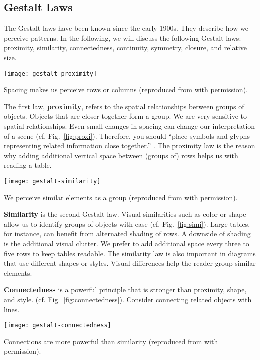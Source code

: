\subsection{Gestalt Laws}

The Gestalt laws have been known since the early 1900s. They describe how we perceive patterns. In the following, we will discuss the following Gestalt laws: proximity, similarity, connectedness, continuity, symmetry, closure, and relative size.

\begin{marginfigure}
\centering
\texttt{[image: gestalt-proximity]}
\caption{\label{fig:proxi} Spacing makes us perceive rows or columns (reproduced from \cite{Ware12} with permission).}%
\end{marginfigure}


The first law, \textbf{proximity}, refers to the spatial relationships between groups of objects. Objects that are closer together form a group. We are very sensitive to spatial relationships. Even small changes in spacing can change our interpretation of a scene (cf. Fig.~\ref{fig:proxi}). Therefore, you should ``place symbols and glyphs representing related information close together.'' 
\cite{Ware12}. The proximity law is the reason why adding additional vertical space between (groups of) rows helps us with reading a table.

\begin{marginfigure}[-2\baselineskip]
\centering
\texttt{[image: gestalt-similarity]}
\caption{\label{fig:simi} We perceive similar elements as a group (reproduced from \cite{Ware12} with permission).}
\end{marginfigure}

\textbf{Similarity} is the second Gestalt law. Visual similarities such as color or shape allow us to identify groups of objects with ease (cf. Fig.~\ref{fig:simi}). Large tables, for instance, can benefit from alternated shading of rows. A downside of shading is the additional visual clutter. We prefer to add additional space every three to five rows to keep tables readable. The similarity law is also important in diagrams that use different shapes or styles. Visual differences help the reader group similar elements.


\textbf{Connectedness} is a powerful principle that is stronger than proximity, shape, and style.  (cf. Fig.~\ref{fig:connectedness}). Consider connecting related objects with lines.
\begin{marginfigure}[-2\baselineskip]
\centering
\texttt{[image: gestalt-connectedness]}
\caption{\label{fig:connectedness} Connections are more powerful than similarity (reproduced from \cite{Ware12} with permission).}
\end{marginfigure}

